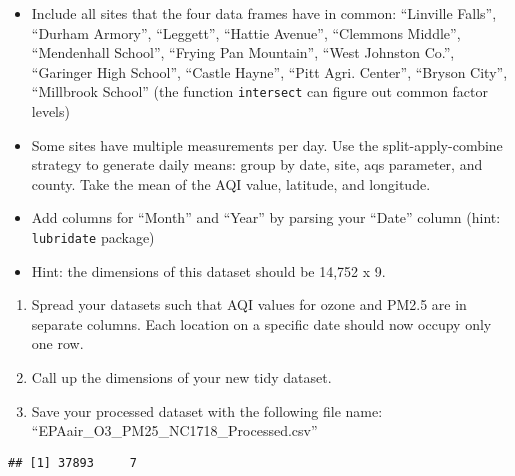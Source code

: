 \documentclass[]{article}
\newenvironment{Shaded}{\begin{snugshade}}{\end{snugshade}}
\newcommand{\CommentTok}[1]{\textcolor[rgb]{0.56,0.35,0.01}{\textit{#1}}}
\newcommand{\KeywordTok}[1]{\textcolor[rgb]{0.13,0.29,0.53}{\textbf{#1}}}
\newcommand{\NormalTok}[1]{#1}
\newcommand{\StringTok}[1]{\textcolor[rgb]{0.31,0.60,0.02}{#1}}
\providecommand{\tightlist}{%
  \setlength{\itemsep}{0pt}\setlength{\parskip}{0pt}}
\begin{document}
\begin{itemize}
\tightlist
\item
  Include all sites that the four data frames have in common: ``Linville
  Falls'', ``Durham Armory'', ``Leggett'', ``Hattie Avenue'', ``Clemmons
  Middle'', ``Mendenhall School'', ``Frying Pan Mountain'', ``West
  Johnston Co.'', ``Garinger High School'', ``Castle Hayne'', ``Pitt
  Agri. Center'', ``Bryson City'', ``Millbrook School'' (the function
  \texttt{intersect} can figure out common factor levels)
\item
  Some sites have multiple measurements per day. Use the
  split-apply-combine strategy to generate daily means: group by date,
  site, aqs parameter, and county. Take the mean of the AQI value,
  latitude, and longitude.
\item
  Add columns for ``Month'' and ``Year'' by parsing your ``Date'' column
  (hint: \texttt{lubridate} package)
\item
  Hint: the dimensions of this dataset should be 14,752 x 9.
\end{itemize}

\begin{enumerate}
\def\labelenumi{\arabic{enumi}.}
\setcounter{enumi}{8}
\tightlist
\item
  Spread your datasets such that AQI values for ozone and PM2.5 are in
  separate columns. Each location on a specific date should now occupy
  only one row.
\item
  Call up the dimensions of your new tidy dataset.
\item
  Save your processed dataset with the following file name:
  ``EPAair\_O3\_PM25\_NC1718\_Processed.csv''
\end{enumerate}

\begin{Shaded}
\end{Shaded}

\begin{verbatim}
## [1] 37893     7
\end{verbatim}
\end{document}
